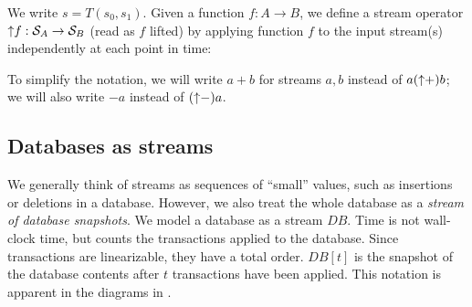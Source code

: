 \begin{center}
\end{center}

We write $s = T(s_0, s_1)$.
Given a function $f: A \to B$, we define a stream operator ${\uparrow}f
:\mathcal{S}_{A} \to \mathcal{S}_{B}$ (read as $f$ lifted) by applying function
$f$ to the input stream(s) independently at each point in time:
\begin{center}
\end{center}

To simplify the notation, we will write $a + b$ for streams $a, b$
instead of $a ({\uparrow}+) b$; we will also write $-a$ instead of
$({\uparrow}-)a$.

\subsection{Databases as streams}

We generally think of streams as sequences of ``small'' values, such
as insertions or deletions in a database.  However, we also treat the
whole database as a \emph{stream of database snapshots}.  We model a
database as a stream $DB$.  Time is not wall-clock time, but counts
the transactions applied to the database.  Since transactions are
linearizable, they have a total order.  $DB[t]$ is the snapshot of the
database contents after $t$ transactions have been applied.  This
notation is apparent in the diagrams in .

